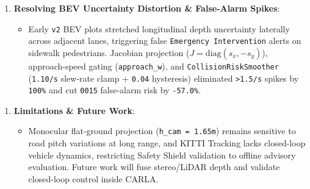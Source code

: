 \documentclass[10.5pt,a4paper]{article}
\begin{document}
\begin{enumerate}[leftmargin=1.8em,itemsep=2pt]
\item \textbf{Resolving BEV Uncertainty Distortion \& False-Alarm Spikes}:
\begin{itemize}[leftmargin=1.5em,itemsep=2pt]
\item Early \texttt{v2} BEV plots stretched longitudinal depth uncertainty laterally across adjacent lanes, triggering false \texttt{Emergency Intervention} alerts on sidewalk pedestrians. Jacobian projection ($J=\text{diag}(s_x,-s_y)$), approach-speed gating (\texttt{approach\_\allowbreak{}w}), and \texttt{CollisionRiskSmoother} (\texttt{1.\allowbreak{}10/\allowbreak{}s} slew-rate clamp + \texttt{0.\allowbreak{}04} hysteresis) eliminated \texttt{>1.\allowbreak{}5/\allowbreak{}s} spikes by \texttt{100\%} and cut \texttt{0015} false-alarm risk by \texttt{-\allowbreak{}57.\allowbreak{}0\%}.
\end{itemize}
\end{enumerate}

\begin{enumerate}[leftmargin=1.8em,itemsep=2pt]
\item \textbf{Limitations \& Future Work}:
\begin{itemize}[leftmargin=1.5em,itemsep=2pt]
\item Monocular flat-ground projection (\texttt{h\_\allowbreak{}cam = 1.\allowbreak{}65m}) remains sensitive to road pitch variations at long range, and KITTI Tracking lacks closed-loop vehicle dynamics, restricting Safety Shield validation to offline advisory evaluation. Future work will fuse stereo/LiDAR depth and validate closed-loop control inside CARLA.
\end{itemize}
\end{enumerate}
\end{document}
